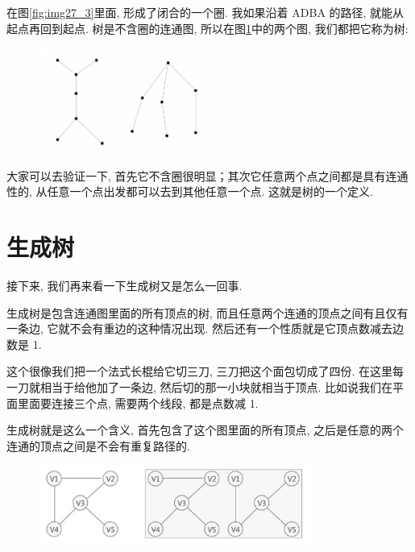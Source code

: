 在图\ref{fig:img27_3}里面, 形成了闭合的一个圈. 我如果沿着 ADBA 的路径, 就能从起点再回到起点. 树是不含圈的连通图, 所以在图\ref{fig:img27_4}中的两个图, 我们都把它称为树: 

\begin{figure}[ht]
  \centering
  \includegraphics[width=0.5\textwidth]{asset/20230924093316.png}
  \caption{}
  \label{fig:img27_4}
\end{figure}

大家可以去验证一下, 首先它不含圈很明显；其次它任意两个点之间都是具有连通性的, 从任意一个点出发都可以去到其他任意一个点. 这就是树的一个定义. 

\section{生成树}

接下来, 我们再来看一下生成树又是怎么一回事. 

生成树是包含连通图里面的所有顶点的树, 而且任意两个连通的顶点之间有且仅有一条边, 它就不会有重边的这种情况出现. 然后还有一个性质就是它顶点数减去边数是 1. 

这个很像我们把一个法式长棍给它切三刀, 三刀把这个面包切成了四份. 在这里每一刀就相当于给他加了一条边, 然后切的那一小块就相当于顶点. 比如说我们在平面里面要连接三个点, 需要两个线段, 都是点数减 1. 

生成树就是这么一个含义, 首先包含了这个图里面的所有顶点, 之后是任意的两个连通的顶点之间是不会有重复路径的. 

\begin{figure}[ht]
  \centering
  \includegraphics[width=0.8\textwidth]{asset/9560c897-3d1c-4169-9c28-681e0ccc1251.png}
  \caption{}
  \label{fig:img27_5}
\end{figure}

